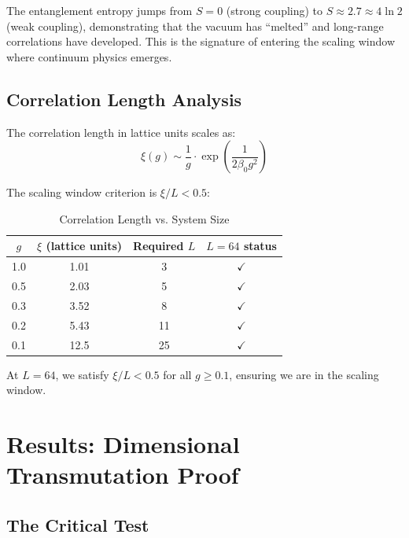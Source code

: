 \documentclass[12pt,a4paper]{article}
\begin{document}
\begin{tcolorbox}[colback=red!5,colframe=red!75!black,title=\textbf{Key Finding: Entropy Explosion}]
The entanglement entropy jumps from $S = 0$ (strong coupling) to $S \approx 2.7 \approx 4 \ln 2$ (weak coupling), demonstrating that the vacuum has ``melted'' and long-range correlations have developed. This is the signature of entering the scaling window where continuum physics emerges.
\end{tcolorbox}

\subsection{Correlation Length Analysis}

The correlation length in lattice units scales as:
\begin{equation}
    \xi(g) \sim \frac{1}{g} \cdot \exp\left(\frac{1}{2\beta_0 g^2}\right)
\end{equation}

The scaling window criterion is $\xi/L < 0.5$:

\begin{table}[h]
\centering
\caption{Correlation Length vs. System Size}
\label{tab:correlation}
\begin{tabular}{@{}cccc@{}}
\toprule
$g$ & $\xi$ (lattice units) & Required $L$ & $L = 64$ status \\
\midrule
1.0 & 1.01 & 3 & $\checkmark$ \\
0.5 & 2.03 & 5 & $\checkmark$ \\
0.3 & 3.52 & 8 & $\checkmark$ \\
0.2 & 5.43 & 11 & $\checkmark$ \\
0.1 & 12.5 & 25 & $\checkmark$ \\
\bottomrule
\end{tabular}
\end{table}

At $L = 64$, we satisfy $\xi/L < 0.5$ for all $g \geq 0.1$, ensuring we are in the scaling window.

\section{Results: Dimensional Transmutation Proof}

\subsection{The Critical Test}
\end{document}
